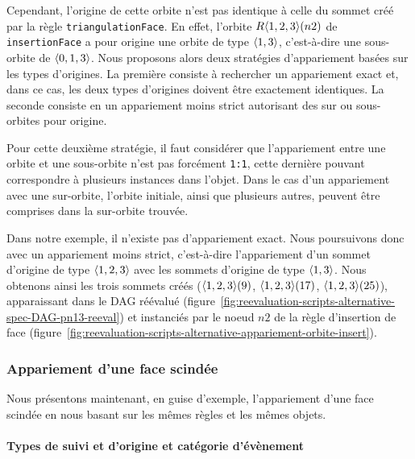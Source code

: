 Cependant, l'origine de cette orbite n'est pas identique à celle du sommet créé
par la règle \texttt{triangulation\-Face}. %
En effet, l'orbite \(R\langle1,2,3\rangle(n2)\) de \texttt{insertion\-Face} a pour
origine une orbite de type \(\langle1,3\rangle\), c'est-à-dire une sous-orbite de
\(\langle0,1,3\rangle\). %
Nous proposons alors deux stratégies d'appariement basées sur les types
d'origines. %
La première consiste à rechercher un appariement exact et, dans ce cas, les deux
types d'origines doivent être exactement identiques. %
La seconde consiste en un appariement moins strict autorisant des sur ou
sous-orbites pour origine. %


Pour cette deuxième stratégie, il faut considérer que l'appariement entre une
orbite et une sous-orbite n'est pas forcément \texttt{1:1}, cette dernière
pouvant correspondre à plusieurs instances dans l'objet. %
Dans le cas d'un appariement avec une sur-orbite, l'orbite initiale, ainsi que
plusieurs autres, peuvent être comprises dans la sur-orbite trouvée. %


Dans notre exemple, il n'existe pas d'appariement exact. %
Nous poursuivons donc avec un appariement moins strict, c'est-à-dire
l'appariement d'un sommet d'origine de type \(\langle1,2,3\rangle\) avec les sommets
d'origine de type \(\langle1,3\rangle\). %
Nous obtenons ainsi les trois sommets créés (\(\langle1,2,3\rangle(9)\),
\(\langle1,2,3\rangle(17)\), \(\langle1,2,3\rangle(25)\)), apparaissant dans le DAG réévalué
(figure~\ref{fig:reevaluation-scripts-alternative-spec-DAG-pn13-reeval}) et
instanciés par le noeud \(n2\) de la règle d'insertion de face
(figure~\ref{fig:reevaluation-scripts-alternative-appariement-orbite-insert}). %



\subsubsection{Appariement d'une face scindée}
\label{sec:reevaluation-scripts-alternative-appariement-scission-face}



Nous présentons maintenant, en guise d'exemple, l'appariement d'une face scindée
en nous basant sur les mêmes règles et les mêmes objets. %



\paragraph{Types de suivi et d'origine et catégorie d'évènement}



